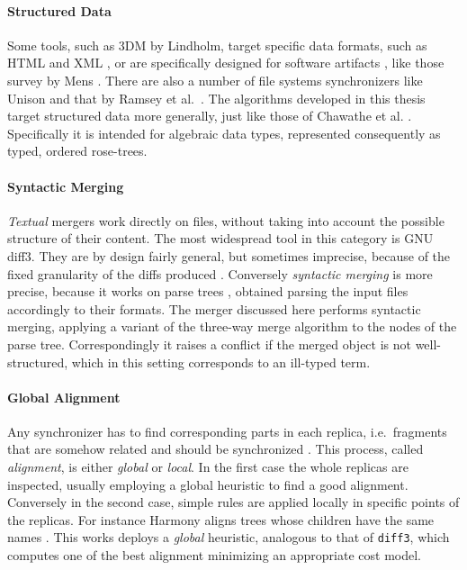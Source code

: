 \documentclass[../Thesis.tex]{subfiles}
\begin{document}
	\paragraph{Structured Data}
	 Some tools, such as 3DM by Lindholm, target specific data formats, such as 
	 HTML and XML \cite{Lind04, Lind05}, or are specifically designed for 
	 software  artifacts \cite{Apel11, Westfechtel91}, like those
	 survey by Mens \cite{Mens02}.
	 There are also a number of file systems synchronizers like Unison
	 \cite{Pierce98, UnisonSpec} and	that by Ramsey et al.\ \cite{Ramsey01}.	 
	 The algorithms developed in this thesis target structured data more 
	 generally, just like those of Chawathe et al. \cite{Chawathe96, 
	 Chawathe97}.
	 Specifically it is intended for algebraic data types, represented 
	 consequently as typed, ordered rose-trees.
	 
	\paragraph{Syntactic Merging}	
	\emph{Textual} mergers work directly on files, without taking into account 
	the possible structure of their content. The most widespread tool in this 
	category is GNU diff3.
	They are by design fairly general, but sometimes imprecise, because of the 
	fixed granularity of the diffs produced \cite{Mens02}.
	Conversely \emph{syntactic merging} is more precise, because it 
	works on parse trees \cite{Mens02}, obtained parsing the input files
	accordingly to their formats.
	The merger discussed here performs syntactic merging, applying
	a variant of the three-way merge algorithm to the nodes of the parse tree.
	Correspondingly it raises a conflict if the merged
	object is not well-structured, which in this setting corresponds to 
	an ill-typed term.
	
	\paragraph{Global Alignment}
	Any synchronizer has to find corresponding parts in each replica, i.e.\
	fragments that are somehow related and should be synchronized 
	\cite{Pierce07}.
	This process, called \emph{alignment}, is either \emph{global} or 
	\emph{local}. In the first case the whole replicas are inspected, usually
	employing a global heuristic to find a good alignment. 
	Conversely in the second case, simple rules are applied locally in specific 
	points of the replicas. For instance Harmony aligns trees whose
	children have the same names \cite{Pierce07}.
	This works deploys a \emph{global} heuristic, analogous to that
	of \texttt{diff3}, which computes one of the best alignment minimizing an
	appropriate cost model.	
	
\end{document}
